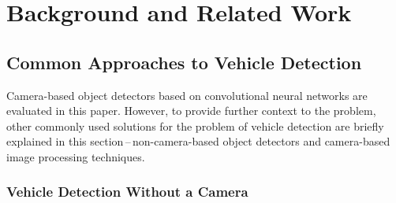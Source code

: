 



\chapter{Background and Related Work}


\section{Common Approaches to Vehicle Detection}

Camera-based object detectors based on convolutional neural networks are
evaluated in this paper. However, to provide further context to the problem,
other commonly used solutions for the problem of vehicle detection are briefly
explained in this section\,--\,non-camera-based object detectors and
camera-based image processing techniques.


\subsection{Vehicle Detection Without a Camera}


